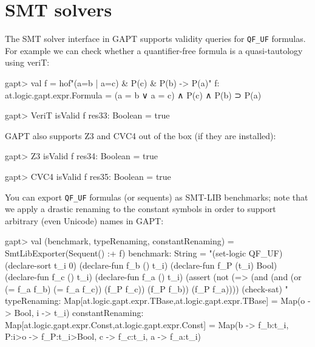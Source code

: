 \documentclass[a4paper,11pt]{book}
\begin{document}
\section{SMT solvers}

The SMT solver interface in GAPT supports validity queries for \verb,QF_UF,
formulas.  For example we can check whether a quantifier-free formula is a
quasi-tautology using veriT:
\begin{clilisting}
gapt> val f = hof"(a=b | a=c) & P(c) & P(b) -> P(a)"
f: at.logic.gapt.expr.Formula = (a = b ∨ a = c) ∧ P(c) ∧ P(b) ⊃ P(a)

\end{clilisting}

\begin{clilisting}
gapt> VeriT isValid f
res33: Boolean = true

\end{clilisting}

GAPT also supports Z3 and CVC4 out of the box (if they are installed):
\begin{clilisting}
gapt> Z3 isValid f
res34: Boolean = true

gapt> CVC4 isValid f
res35: Boolean = true

\end{clilisting}

You can export \verb,QF_UF, formulas (or sequents) as SMT-LIB benchmarks;
note that we apply a drastic renaming to the constant symbols in order to
support arbitrary (even Unicode) names in GAPT:
\begin{clilisting}
gapt> val (benchmark, typeRenaming, constantRenaming) = SmtLibExporter(Sequent() :+ f)
benchmark: String =
"(set-logic QF_UF)
(declare-sort t_i 0)
(declare-fun f_b () t_i)
(declare-fun f_P (t_i) Bool)
(declare-fun f_c () t_i)
(declare-fun f_a () t_i)
(assert (not (=> (and (and (or (= f_a f_b) (= f_a f_c)) (f_P f_c)) (f_P f_b)) (f_P f_a))))
(check-sat)
"
typeRenaming: Map[at.logic.gapt.expr.TBase,at.logic.gapt.expr.TBase] = Map(o -> Bool, i -> t_i)
constantRenaming: Map[at.logic.gapt.expr.Const,at.logic.gapt.expr.Const] = Map(b -> f_b:t_i, P:i>o -> f_P:t_i>Bool, c -> f_c:t_i, a -> f_a:t_i)

\end{clilisting}
\end{document}
